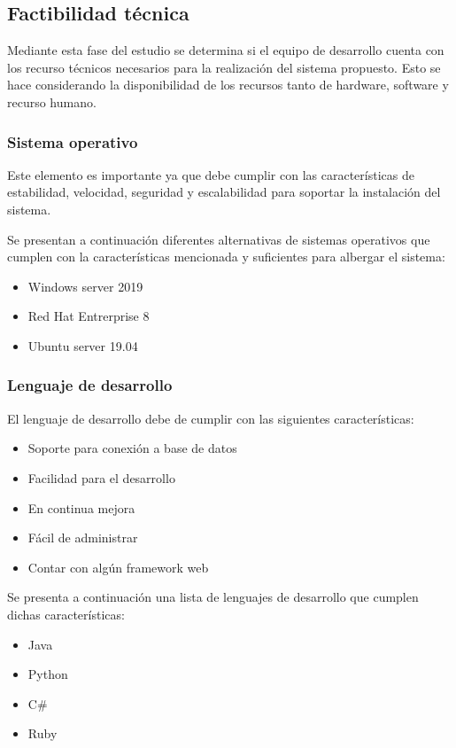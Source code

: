 \subsection{Factibilidad técnica}

Mediante esta fase del estudio se determina si el equipo de desarrollo cuenta con los recurso técnicos necesarios para la realización del sistema propuesto. Esto se hace considerando la disponibilidad de los recursos tanto de hardware, software y recurso humano.

\subsubsection{Sistema operativo}

Este elemento es importante ya que debe cumplir con las características de estabilidad, velocidad, seguridad y escalabilidad para soportar la instalación del sistema.


Se presentan a continuación diferentes alternativas de sistemas operativos que cumplen con la características mencionada y suficientes para albergar el sistema:

\begin{itemize}
    \item Windows server 2019
    \item Red Hat Entrerprise 8
    \item Ubuntu server 19.04
\end{itemize}

\subsubsection{Lenguaje de desarrollo}

El lenguaje de desarrollo debe de cumplir con las siguientes características:

\begin{itemize}
    \item Soporte para conexión a base de datos
    \item Facilidad para el desarrollo
    \item En continua mejora
    \item Fácil de administrar
    \item Contar con algún framework web
\end{itemize}

Se presenta a continuación una lista de lenguajes de desarrollo que cumplen dichas características:

\begin{itemize}
    \item Java
    \item Python
    \item C\#
    \item Ruby
\end{itemize}

